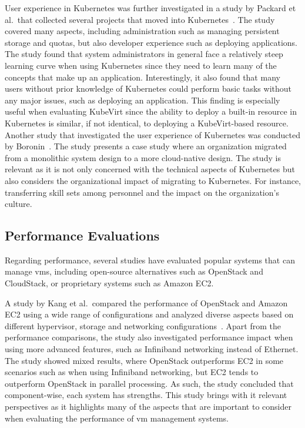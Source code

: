 \documentclass{kththesis}
\begin{document}
User experience in Kubernetes was further investigated in a study by Packard et al.\ that collected several projects that moved into Kubernetes\ \cite{k8s-user-experience}. The study covered many aspects, including administration such as managing persistent storage and quotas, but also developer experience such as deploying applications. The study found that system administrators in general face a relatively steep learning curve when using Kubernetes since they need to learn many of the concepts that make up an application. Interestingly, it also found that many users without prior knowledge of Kubernetes could perform basic tasks without any major issues, such as deploying an application. This finding is especially useful when evaluating KubeVirt since the ability to deploy a built-in resource in Kubernetes is similar, if not identical, to deploying a KubeVirt-based resource. Another study that investigated the user experience of Kubernetes was conducted by Boronin\ \cite{k8s-migration-king}. The study presents a case study where an organization migrated from a monolithic system design to a more cloud-native design. The study is relevant as it is not only concerned with the technical aspects of Kubernetes but also considers the organizational impact of migrating to Kubernetes. For instance, transferring skill sets among personnel and the impact on the organization's culture.

\subsection{Performance Evaluations}
Regarding performance, several studies have evaluated popular systems that can manage \Glspl{vm}, including open-source alternatives such as OpenStack and CloudStack, or proprietary systems such as Amazon EC2. 

A study by Kang et al.\ compared the performance of OpenStack and Amazon EC2 using a wide range of configurations and analyzed diverse aspects based on different hypervisor, storage and networking configurations\ \cite{openstack-ec2-comparison}. Apart from the performance comparisons, the study also investigated performance impact when using more advanced features, such as Infiniband networking instead of Ethernet. The study showed mixed results, where OpenStack outperforms EC2 in some scenarios such as when using Infiniband networking, but EC2 tends to outperform OpenStack in parallel processing. As such, the study concluded that component-wise, each system has strengths. This study brings with it relevant perspectives as it highlights many of the aspects that are important to consider when evaluating the performance of \Gls{vm} management systems.
\end{document}
